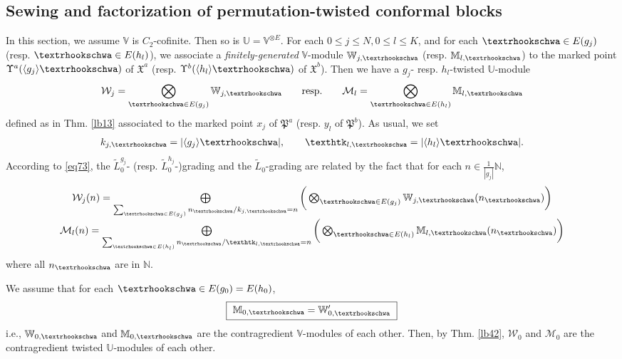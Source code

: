 \documentclass[11pt,b5paper,notitlepage]{article}
\theoremstyle{definition}
\theoremstyle{plain}
\newcommand{\fk}{\mathfrak}
\newcommand{\mc}{\mathcal}
\newcommand{\wtd}{\widetilde}
\newcommand{\bk}[1]{\langle {#1}\rangle}
\newcommand{\Vbb}{\mathbb V}
\newcommand{\Ubb}{\mathbb U}
\newcommand{\Wbb}{\mathbb W}
\newcommand{\Mbb}{\mathbb M}
\newcommand{\Nbb}{\mathbb N}
\newcommand{\tipae}{\text{\textrhookschwa}}
\newcommand{\tipak}{\text{\texthtk}}
\numberwithin{equation}{subsection}
\begin{document}
\subsection{Sewing and factorization of permutation-twisted conformal blocks}

In this section, we assume $\Vbb$ is $C_2$-cofinite. Then so is $\Ubb=\Vbb^{\otimes E}$. For each $0\leq j\leq N,0\leq l\leq K$, and for each $\tipae\in E(g_j)$ (resp. $\tipae\in E(h_l)$), we associate a \emph{finitely-generated} $\Vbb$-module $\Wbb_{j,\tipae}$ (resp. $\Mbb_{l,\tipae}$) to the marked point $\Upsilon^a(\bk{g_j}\tipae)$ of $\fk X^a$ (resp. $\Upsilon^b(\bk{h_l}\tipae)$ of $\fk X^b$). Then we have a $g_j$- resp. $h_l$-twisted $\Ubb$-module
\begin{gather*}
\mc W_j=\bigotimes_{\tipae\in E(g_j)}\Wbb_{j,\tipae}\qquad \text{resp.}\qquad 	\mc M_l=\bigotimes_{\tipae\in E(h_l)}\Mbb_{l,\tipae}
\end{gather*}
defined as in Thm. \ref{lb13} associated to the marked point $x_j$ of $\fk P^a$ (resp. $y_l$ of $\fk P^b$). As usual, we set
\begin{align*}
k_{j,\tipae}=|\bk{g_j}\tipae|,\qquad \tipak_{l,\tipae}=|\bk{h_l}\tipae|.	
\end{align*}
According to \eqref{eq73}, the $\wtd L_0^{g_j}$- (resp. $\wtd L_0^{h_j}$-)grading and the $\wtd L_0$-grading are related by the fact that for each $n\in\frac 1{|g_j|}\Nbb$,
\begin{gather}\label{eq74}
\begin{array}{c}
\mc W_j(n)=\bigoplus\limits_{\sum_{\tipae\in E(g_j)}n_{\tipae}/k_{j,\tipae}=n}\bigg(\bigotimes_{\tipae\in E(g_j)}\Wbb_{j,\tipae}(n_\tipae)\bigg)\\[1.5ex]
\mc M_l(n)=\bigoplus\limits_{\sum_{\tipae\in E(h_l)}n_{\tipae}/\tipak_{l,\tipae}=n}\bigg(\bigotimes_{\tipae\in E(h_l)}\Mbb_{l,\tipae}(n_\tipae)\bigg)
\end{array}	
\end{gather}
where all $n_\tipae$ are in $\Nbb$.

We assume that for each $\tipae\in E(g_0)=E(h_0)$,
\begin{align*}
\boxed{~\Mbb_{0,\tipae}=\Wbb_{0,\tipae}'~}
\end{align*}
i.e., $\Wbb_{0,\tipae}$ and $\Mbb_{0,\tipae}$ are the contragredient $\Vbb$-modules of each other.  Then, by Thm. \ref{lb42}, $\mc W_0$ and $\mc M_0$ are the contragredient twisted $\Ubb$-modules of each other.
\end{document}
